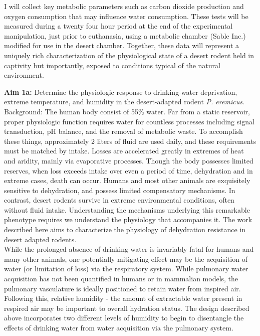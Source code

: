 \documentclass[11pt]{article}
\begin{document}
I will collect key metabolic parameters such as carbon dioxide production and oxygen consumption that may influence water consumption. These tests will be measured during a twenty four hour period at the end of the experimental manipulation, just prior to euthanasia, using a metabolic chamber (Sable Inc.) modified for use in the desert chamber. Together, these data will represent a uniquely rich characterization of the physiological state of a desert rodent held in captivity but importantly, exposed to conditions typical of the natural environment. \\


\vspace{5mm}


\noindent \textbf{Aim 1a:} Determine the physiologic response to drinking-water deprivation, extreme temperature, and humidity in the desert-adapted rodent \textit{P. eremicus}. \\


Background: The human body consist of 55\% water. Far from a static reservoir, proper physiologic function requires water for countless processes including signal transduction, pH balance, and the removal of metabolic waste. To accomplish these things, approximately 2 liters of fluid are used daily, and these requirements must be matched by intake. Losses are accelerated greatly in extremes of heat and aridity, mainly via evaporative processes. Though the body possesses limited reserves, when loss exceeds intake over even a period of time, dehydration and in extreme cases, death can occur. Humans and most other animals are exquisitely sensitive to dehydration, and possess limited compensatory mechanisms. In contrast, desert rodents survive in extreme environmental conditions, often without fluid intake. Understanding the mechanisms underlying this remarkable phenotype requires we understand the physiology that accompanies it. The work described here aims to characterize the physiology of dehydration resistance in desert adapted rodents. \\

While the prolonged absence of drinking water is invariably fatal for humans and many other animals, one potentially mitigating effect may be the acquisition of water (or limitation of loss) via the respiratory system. While pulmonary water acquisition has not been quantified in humans or in mammalian models, the pulmonary vasculature is ideally positioned to retain water from inspired air. Following this, relative humidity -  the amount of extractable water present in respired air may be important to overall hydration status. The design described above incorporates two different levels of humidity to begin to disentangle the effects of drinking water from water acquisition via the pulmonary system. \\
\end{document}
